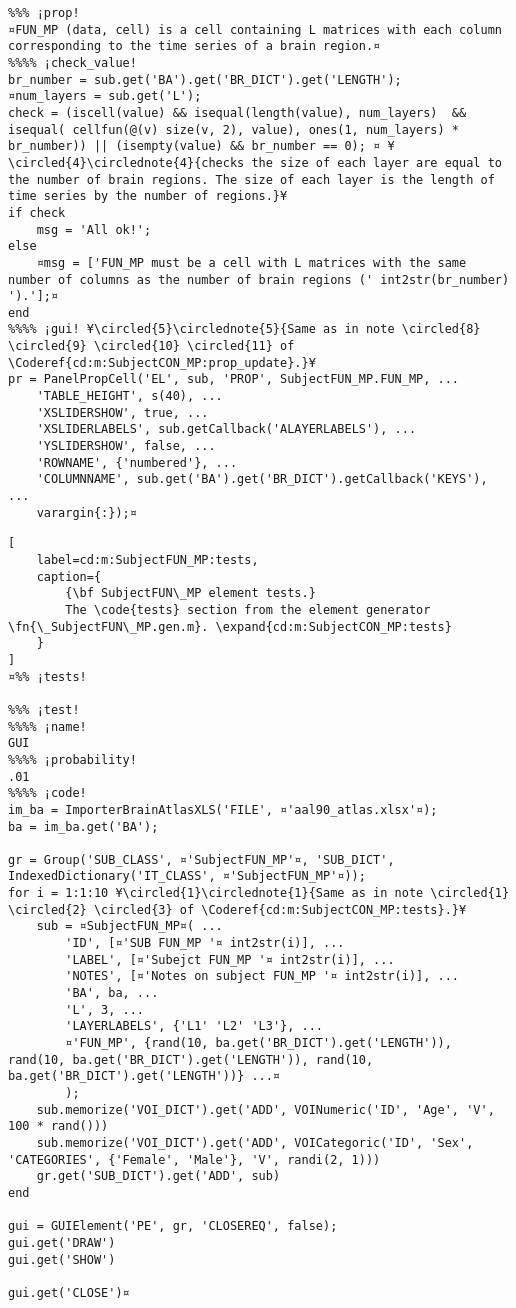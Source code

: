 \documentclass{tufte-handout}
\begin{document}
\begin{lstlisting}
%%% ¡prop!
¤FUN_MP (data, cell) is a cell containing L matrices with each column corresponding to the time series of a brain region.¤
%%%% ¡check_value!
br_number = sub.get('BA').get('BR_DICT').get('LENGTH');
¤num_layers = sub.get('L');
check = (iscell(value) && isequal(length(value), num_layers)  && isequal( cellfun(@(v) size(v, 2), value), ones(1, num_layers) * br_number)) || (isempty(value) && br_number == 0); ¤ ¥\circled{4}\circlednote{4}{checks the size of each layer are equal to the number of brain regions. The size of each layer is the length of time series by the number of regions.}¥
if check
    msg = 'All ok!';
else   
    ¤msg = ['FUN_MP must be a cell with L matrices with the same number of columns as the number of brain regions (' int2str(br_number) ').'];¤
end
%%%% ¡gui! ¥\circled{5}\circlednote{5}{Same as in note \circled{8} \circled{9} \circled{10} \circled{11} of \Coderef{cd:m:SubjectCON_MP:prop_update}.}¥
pr = PanelPropCell('EL', sub, 'PROP', SubjectFUN_MP.FUN_MP, ...
    'TABLE_HEIGHT', s(40), ...
    'XSLIDERSHOW', true, ...
    'XSLIDERLABELS', sub.getCallback('ALAYERLABELS'), ...
    'YSLIDERSHOW', false, ...
    'ROWNAME', {'numbered'}, ...
    'COLUMNNAME', sub.get('BA').get('BR_DICT').getCallback('KEYS'), ...
    varargin{:});¤

\end{lstlisting}

\begin{lstlisting}[
	label=cd:m:SubjectFUN_MP:tests,
	caption={
		{\bf SubjectFUN\_MP element tests.}
		The \code{tests} section from the element generator \fn{\_SubjectFUN\_MP.gen.m}. \expand{cd:m:SubjectCON_MP:tests}
	}
]
¤%% ¡tests!

%%% ¡test!
%%%% ¡name!
GUI
%%%% ¡probability!
.01
%%%% ¡code!
im_ba = ImporterBrainAtlasXLS('FILE', ¤'aal90_atlas.xlsx'¤);
ba = im_ba.get('BA');

gr = Group('SUB_CLASS', ¤'SubjectFUN_MP'¤, 'SUB_DICT', IndexedDictionary('IT_CLASS', ¤'SubjectFUN_MP'¤));
for i = 1:1:10 ¥\circled{1}\circlednote{1}{Same as in note \circled{1} \circled{2} \circled{3} of \Coderef{cd:m:SubjectCON_MP:tests}.}¥
    sub = ¤SubjectFUN_MP¤( ...
        'ID', [¤'SUB FUN_MP '¤ int2str(i)], ...
        'LABEL', [¤'Subejct FUN_MP '¤ int2str(i)], ...
        'NOTES', [¤'Notes on subject FUN_MP '¤ int2str(i)], ...
        'BA', ba, ...
        'L', 3, ...
        'LAYERLABELS', {'L1' 'L2' 'L3'}, ...
        ¤'FUN_MP', {rand(10, ba.get('BR_DICT').get('LENGTH')), rand(10, ba.get('BR_DICT').get('LENGTH')), rand(10, ba.get('BR_DICT').get('LENGTH'))} ...¤
        );
    sub.memorize('VOI_DICT').get('ADD', VOINumeric('ID', 'Age', 'V', 100 * rand()))
    sub.memorize('VOI_DICT').get('ADD', VOICategoric('ID', 'Sex', 'CATEGORIES', {'Female', 'Male'}, 'V', randi(2, 1)))
    gr.get('SUB_DICT').get('ADD', sub)
end

gui = GUIElement('PE', gr, 'CLOSEREQ', false);
gui.get('DRAW')
gui.get('SHOW')

gui.get('CLOSE')¤
\end{lstlisting}
\end{document}
